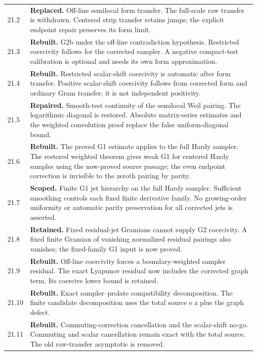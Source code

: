 \documentclass[11pt]{article}
\theoremstyle{remark}
\begin{document}
\begin{longtable}{@{}p{}p{}@{}}
21.2 & \textbf{Replaced.} Off-line semilocal form transfer. The full-scale raw transfer is withdrawn. Centered strip transfer retains jumps; the explicit endpoint repair preserves its form limit. \\[4pt]
21.3 & \textbf{Rebuilt.} G2b under the off-line contradiction hypothesis. Restricted coercivity follows for the corrected sampler. A negative compact-test calibration is optional and needs its own form approximation. \\[4pt]
21.4 & \textbf{Rebuilt.} Restricted scalar-shift coercivity is automatic after form transfer. Positive scalar-shift coercivity follows from corrected form and ordinary Gram transfer; it is not independent positivity. \\[4pt]
21.5 & \textbf{Repaired.} Smooth-test continuity of the semilocal Weil pairing. The logarithmic diagonal is restored. Absolute matrix-series estimates and the weighted convolution proof replace the false uniform-diagonal bound. \\[4pt]
21.6 & \textbf{Rebuilt.} The proved G1 estimate applies to the full Hardy sampler. The restored weighted theorem gives weak G1 for centered Hardy samples using the now-proved source passage; the even endpoint correction is invisible to the zeroth pairing by parity. \\[4pt]
21.7 & \textbf{Scoped.} Finite G1 jet hierarchy on the full Hardy sampler. Sufficient smoothing controls each fixed finite derivative family. No growing-order uniformity or automatic parity preservation for all corrected jets is asserted. \\[4pt]
21.8 & \textbf{Retained.} Fixed residual-jet Gramians cannot supply G2 coercivity. A fixed finite Gramian of vanishing normalized residual pairings also vanishes; the fixed-family G1 input is now proved. \\[4pt]
21.9 & \textbf{Rebuilt.} Off-line coercivity forces a boundary-weighted sampler residual. The exact Lyapunov residual now includes the corrected graph term. Its coercive lower bound is retained. \\[4pt]
21.10 & \textbf{Rebuilt.} Exact sampler--prolate compatibility decomposition. The finite candidate decomposition uses the total source e z plus the graph defect. \\[4pt]
21.11 & \textbf{Rebuilt.} Commuting-correction cancellation and the scalar-shift no-go. Commuting and scalar cancellation remain exact with the total source. The old raw-transfer asymptotic is removed. \\[4pt]

\end{longtable}
\end{document}
